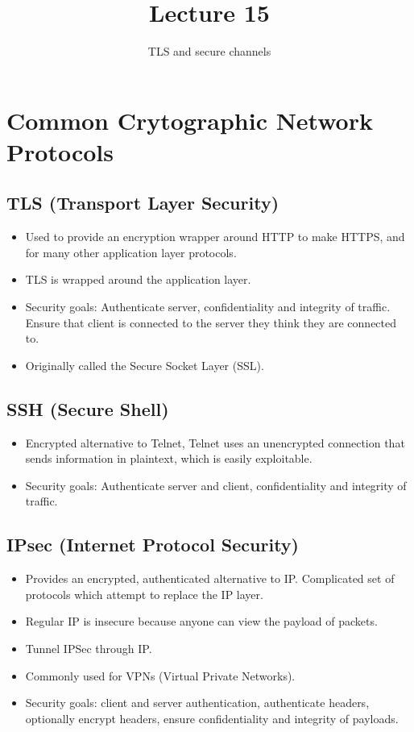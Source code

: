 \documentclass[11pt]{article} %
\title{Lecture 15}
\author{TLS and secure channels}
\begin{document}
\maketitle

\section{Common Crytographic Network Protocols}

\subsection{TLS (Transport Layer Security)}
\begin{itemize}
  \item  Used to provide an encryption wrapper around HTTP to make HTTPS, and for
  many other application layer protocols.
  \item TLS is wrapped around the application layer.
  \item Security goals: Authenticate server, confidentiality and integrity of
  traffic. Ensure that client is connected to the server they think they are
  connected to.
  \item Originally called the Secure Socket Layer (SSL).
\end{itemize}

\subsection{SSH (Secure Shell)}
\begin{itemize}
  \item Encrypted alternative to Telnet, Telnet uses an unencrypted connection
  that sends information in plaintext, which is easily exploitable.
  \item Security goals: Authenticate server and client, confidentiality and
  integrity of traffic.
\end{itemize}

\subsection{IPsec (Internet Protocol Security)}
\begin{itemize}
  \item Provides an encrypted, authenticated alternative to IP. Complicated set
  of protocols which attempt to replace the IP layer.
  \item Regular IP is insecure because anyone can view the payload of packets.
  \item Tunnel IPSec through IP.
  \item Commonly used for VPNs (Virtual Private Networks).
  \item Security goals: client and server authentication, authenticate headers,
  optionally encrypt headers, ensure confidentiality and integrity of payloads.
\end{itemize}
\end{document}
